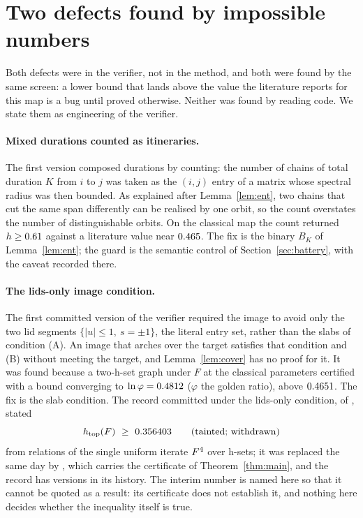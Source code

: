 \documentclass[11pt]{article}
\newcommand{\htop}{h_{\mathrm{top}}}
\begin{document}
\section{Two defects found by impossible numbers}\label{sec:defects}

Both defects were in the verifier, not in the method, and both were found by the same screen: a lower bound that
lands above the value the literature reports for this map is a bug until proved otherwise. Neither was found by
reading code. We state them as engineering of the verifier.

\paragraph{Mixed durations counted as itineraries.} The first version composed durations by counting: the number of
chains of total duration $K$ from $i$ to $j$ was taken as the $(i,j)$ entry of a matrix whose spectral radius was then
bounded. As explained after Lemma~\ref{lem:ent}, two chains that cut the same span differently can be realised by one
orbit, so the count overstates the number of distinguishable orbits. On the classical map the count returned
$h\ge0.61$ against a literature value near $0.465$. The fix is the binary $B_K$ of
Lemma~\ref{lem:ent}; the guard is the semantic control of Section~\ref{sec:battery}, with the caveat recorded there.

\paragraph{The lids-only image condition.} The first committed version of the verifier required the image to avoid
only the two lid segments $\{|u|\le1,\ s=\pm1\}$, the literal entry set, rather than the slabs of condition (A). An
image that arches over the target satisfies that condition and (B) without meeting the target, and Lemma~\ref{lem:cover}
has no proof for it. It was found because a two-h-set graph under $F$ at the classical parameters certified with a
bound converging to $\ln\varphi=0.4812$ ($\varphi$ the golden ratio), above $0.4651$. The fix is the slab
condition. The record committed under the lids-only condition, \texttt{\RecordCommit} of \RecordDate, stated
\[
\htop(F)\ \ge\ \TaintedBound\qquad\text{(tainted; withdrawn)}
\]
from \TaintedEdges{} relations of the single uniform iterate $F^{4}$ over \TaintedBoxes{} h-sets; it was replaced
the same day by \texttt{\SoundCommit}, which carries the certificate of Theorem~\ref{thm:main}, and the record has
\RecordCommits{} versions in its history. The interim number is named here so that it cannot be quoted as a result: its
certificate does not establish it, and nothing here decides whether the inequality itself is true.
\end{document}
